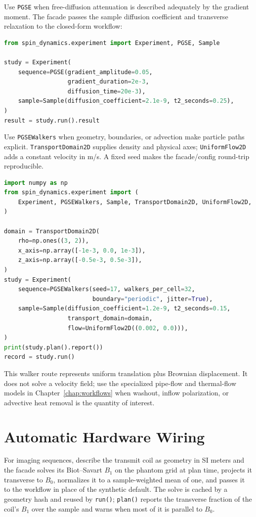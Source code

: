 \documentclass[11pt,oneside]{report}
\newcommand{\code}[1]{\texttt{#1}}
\begin{document}
Use \code{PGSE} when free-diffusion attenuation is described adequately by the
gradient moment. The facade passes the sample diffusion coefficient and
transverse relaxation to the closed-form workflow:

\begin{lstlisting}[language=Python]
from spin_dynamics.experiment import Experiment, PGSE, Sample

study = Experiment(
    sequence=PGSE(gradient_amplitude=0.05,
                  gradient_duration=2e-3,
                  diffusion_time=20e-3),
    sample=Sample(diffusion_coefficient=2.1e-9, t2_seconds=0.25),
)
result = study.run().result
\end{lstlisting}

Use \code{PGSEWalkers} when geometry, boundaries, or advection make particle
paths explicit. \code{TransportDomain2D} supplies density and physical axes;
\code{UniformFlow2D} adds a constant velocity in m/s. A fixed seed makes the
facade/config round-trip reproducible.

\begin{lstlisting}[language=Python]
import numpy as np
from spin_dynamics.experiment import (
    Experiment, PGSEWalkers, Sample, TransportDomain2D, UniformFlow2D,
)

domain = TransportDomain2D(
    rho=np.ones((3, 2)),
    x_axis=np.array([-1e-3, 0.0, 1e-3]),
    z_axis=np.array([-0.5e-3, 0.5e-3]),
)
study = Experiment(
    sequence=PGSEWalkers(seed=17, walkers_per_cell=32,
                         boundary="periodic", jitter=True),
    sample=Sample(diffusion_coefficient=1.2e-9, t2_seconds=0.15,
                  transport_domain=domain,
                  flow=UniformFlow2D((0.002, 0.0))),
)
print(study.plan().report())
record = study.run()
\end{lstlisting}

This walker route represents uniform translation plus Brownian displacement. It
does not solve a velocity field; use the specialized pipe-flow and thermal-flow
models in Chapter~\ref{chap:workflows} when washout, inflow polarization, or
advective heat removal is the quantity of interest.

\section{Automatic Hardware Wiring}

For imaging sequences, describe the transmit coil as geometry in SI meters and
the facade solves its Biot--Savart \(B_1\) on the phantom grid at plan time,
projects it transverse to \(B_0\), normalizes it to a sample-weighted mean of
one, and passes it to the workflow in place of the synthetic default. The solve
is cached by a geometry hash and reused by \code{run()}; \code{plan()} reports
the transverse fraction of the coil's \(B_1\) over the sample and warns when
most of it is parallel to \(B_0\).
\end{document}
